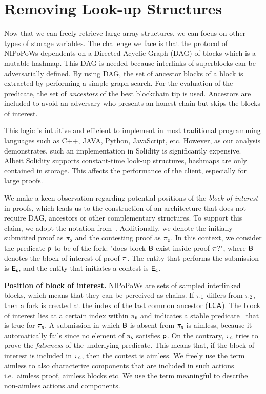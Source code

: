 \section{Removing Look-up Structures}

Now that we can freely retrieve large array structures, we can focus on other
types of storage variables. The challenge we face is that the protocol of
NIPoPoWs dependents on a Directed Acyclic Graph (DAG) of blocks which is a
mutable hashmap. This DAG is needed because interlinks of superblocks can be
adversarially defined. By using DAG, the set of ancestor blocks of a block is
extracted by performing a simple graph search. For the evaluation of the
predicate, the set of \emph{ancestors} of the best blockchain tip is used.
Ancestors are included to avoid an adversary who presents an honest chain but
skips the blocks of interest.

This logic is intuitive and efficient to implement in most traditional
programming languages such as C++, JAVA, Python, JavaScript, etc. However, as
our analysis demonstrates, such an implementation in Solidity is significantly
expensive. Albeit Solidity supports constant-time look-up structures, hashmaps
are only contained in storage. This affects the performance of the client,
especially for large proofs.

We make a keen observation regarding potential positions of the \emph{block of
interest} in proofs, which leads us to the construction of an architecture that
does not require DAG, ancestors or other complementary structures. To support
this claim, we adopt the notation from~\cite{nipopows}.  Additionally, we
denote the initially submitted proof as $\mathsf{\pi_{s}}$ and the contesting proof as
$\mathsf{\pi_{c}}$. In this context, we consider the predicate $\mathsf{p}$ to be of the fork: "does block
$\mathsf{B}$ exist inside proof $\mathsf{\pi}$?", where $\mathsf{B}$ denotes the block of interest
of proof $\mathsf{\pi}$. The entity that performs the submission is $\mathsf{E_{s}}$, and the entity
that initiates a contest is $\mathsf{E_{c}}$.

\noindent \textbf{Position of block of interest.} NIPoPoWs are sets of sampled
interlinked blocks, which means that they can be perceived as chains. If
$\mathsf{\pi}_1$ differs from $\mathsf{\pi}_2$, then a fork is created at the index of the last
common ancestor ($\mathsf{LCA}$). The block of interest lies at a certain index within
$\mathsf{\pi_{s}}$ and indicates a stable predicate~\cite{nipopows, generic-client} that is
true for $\mathsf{\pi_{s}}$. A submission in which $\mathsf{B}$ is absent from $\mathsf{\pi_{s}}$ is aimless,
because it automatically fails since no element of $\mathsf{\pi_{s}}$ satisfies $\mathsf{p}$. On
the contrary, $\mathsf{\pi_{c}}$ tries to prove the \emph{falseness} of the underlying
predicate. This means that, if the block of interest is included in $\mathsf{\pi_{c}}$,
then the contest is aimless. We freely use the term aimless to also
characterize components that are included in such actions i.e.\ aimless proof,
aimless blocks etc. We use the term meaningful to describe non-aimless actions
and components.

